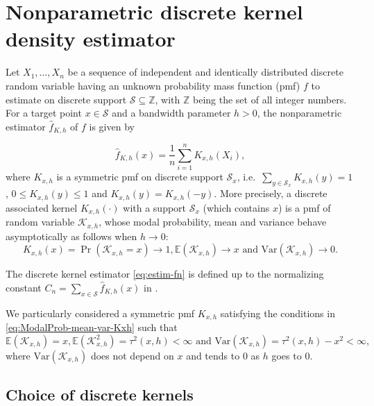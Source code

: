 \section{Nonparametric discrete kernel density estimator}\label{sec2-nonparametric-kernel-estimation}

Let \(X_{1}, \ldots, X_{n}\) be a sequence of independent and identically distributed discrete random variable having an unknown probability mass function (pmf) \(f\) to estimate on discrete support \(\mathcal{S}\subseteq \mathbb{Z}\), with \(\mathbb{Z}\) being the set of all integer numbers.
For a target point \(x\in\mathcal{S}\) and a bandwidth parameter \(h>0\), the nonparametric estimator \(\widehat{f}_{K,h}\) of \(f\) is given by

\begin{equation}
\widehat{f}_{K,h}(x)=\frac{1}{n}\sum_{i=1}^{n}K_{x,h}(X_{i}),
\label{eq:estim-fn}
\end{equation}
where \(K_{x,h}\) is a symmetric pmf on discrete support \(\mathcal{S}_{x}\), i.e.~\(\sum_{y\in\mathcal{S}_{x}}K_{x,h}(y)=1\), \(0\leq K_{x,h}(y)\leq 1\) and \(K_{x,h}(y)=K_{x,h}(-y)\). More precisely, a discrete associated kernel \(K_{x,h}(\cdot)\) with a support \(\mathcal{S}_{x}\) (which contains \(x\)) is a pmf of random variable \(\mathcal{K}_{x,h}\), whose modal probability, mean and variance behave asymptotically as follows when \(h\to 0\):
\begin{equation}
K_{x,h}(x)=\Pr(\mathcal{K}_{x,h}=x) \to 1, \mathbb{E}(\mathcal{K}_{x,h}) \to x \text{ and } \text{Var}(\mathcal{K}_{x,h}) \to 0.
\label{eq:ModalProb-mean-var-Kxh}
\end{equation}

The discrete kernel estimator \eqref{eq:estim-fn} is defined up to the normalizing constant \(C_{n}=\sum_{x\in\mathcal{S}}\widehat{f}_{K,h}(x)\) in \citet{Senga2017}.

We particularly considered a symmetric pmf \(K_{x,h}\) satisfying the conditions in \eqref{eq:ModalProb-mean-var-Kxh} such that
\begin{equation} 
 \mathbb{E}(\mathcal{K}_{x,h}) =x, \mathbb{E}(\mathcal{K}^{2}_{x,h}) =\tau^{2}(x,h)<\infty \text{ and } \text{Var}(\mathcal{K}_{x,h})=\tau^{2}(x,h)- x^{2}<\infty,  
\label{eq:condition-symm-kern}
\end{equation}
where \(\text{Var}(\mathcal{K}_{x,h})\) does not depend on \(x\) and tends to \(0\) as \(h\) goes to \(0\).

\subsection{Choice of discrete kernels}\label{choice-of-discrete-kernels}

